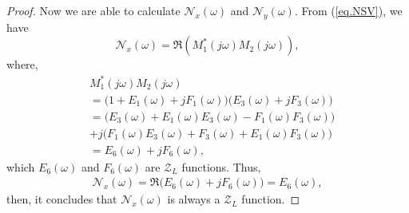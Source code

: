 \begin{proof}
Now we are able to calculate $\mathcal{N}_x (\omega)$ and $\mathcal{N}_y (\omega)$. From (\ref{eq.NSV}), we have
\begin{equation}
    \mathcal{N}_x(\omega)=\mathfrak{R}(M_1^{*}(j\omega)M_2(j\omega)),
\end{equation}
where, 
\begin{equation}
\begin{split}
    &M_1^{*}(j\omega)M_2(j\omega)\\
    &=\Big(1+E_1(\omega)+jF_1(\omega)\Big)\Big(E_3(\omega)+jF_3(\omega)\Big)\\
    &=\bigg(E_3(\omega)+E_1(\omega)E_3(\omega)-F_1(\omega)F_3(\omega)\bigg)\\
         &+j\bigg(F_1(\omega)E_3(\omega)+F_3(\omega)+E_1(\omega)F_3(\omega)\bigg)\\
         &= E_6(\omega)+jF_6(\omega),
    \end{split}
    \end{equation}
which $E_6(\omega)$ and $F_6(\omega)$ are $\mathcal{Z}_L$ functions. Thus,
\begin{equation}
\begin{split}
    \mathcal{N}_x (\omega)=\mathfrak{R}\Big(E_6(\omega)+jF_6(\omega)\Big)=E_6(\omega),
    \end{split}
\end{equation}
then, it concludes that $\mathcal{N}_x (\omega)$ is always a $\mathcal{Z}_L$ function.


\end{proof}
